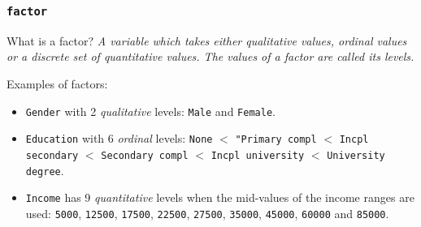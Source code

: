 \documentclass{beamer}\usepackage[]{graphicx}\usepackage[]{color}
\makeatletter
\newcommand{\hlopt}[1]{\textcolor[rgb]{0,0,0}{\textbf{#1}}}%
\newcommand{\hlstd}[1]{\textcolor[rgb]{0,0,0}{#1}}%
\newcommand{\hlkwd}[1]{\textcolor[rgb]{0,0.267,0.4}{#1}}%
\newenvironment{kframe}{%
 \def\at@end@of@kframe{}%
 \ifinner\ifhmode%
  \def\at@end@of@kframe{\end{minipage}}%
  \begin{minipage}{\columnwidth}%
 \fi\fi%
 \def\FrameCommand##1{\hskip\@totalleftmargin \hskip-\fboxsep
 \colorbox{shadecolor}{##1}\hskip-\fboxsep
     \hskip-\linewidth \hskip-\@totalleftmargin \hskip\columnwidth}%
 \MakeFramed {\advance\hsize-\width
   \@totalleftmargin\z@ \linewidth\hsize
   \@setminipage}}%
 {\par\unskip\endMakeFramed%
 \at@end@of@kframe}
\newenvironment{knitrout}{}{} %
\makeatother
\begin{document}
\begin{frame}
  \frametitle{\texttt{factor}}
  \begin{block}{What is a factor?}
    \textit{A variable which takes either qualitative values, ordinal values or a discrete set of quantitative values. The values of a factor are called its {\em levels}.}
  \end{block}
Examples of factors:  
\begin{itemize}
  \item \texttt{Gender} with 2 {\em qualitative} levels: \texttt{Male} and \texttt{Female}.
  \item \texttt{Education} with 6 {\em ordinal} levels: \texttt{None} $<$ \texttt{"Primary compl} $<$ \texttt{Incpl secondary} $<$ \texttt{Secondary compl} $<$ \texttt{Incpl university} $<$ \texttt{University degree}.
  \item \texttt{Income} has 9 {\em quantitative} levels when the mid-values of the income ranges are used: \texttt{5000}, \texttt{12500}, \texttt{17500}, \texttt{22500}, \texttt{27500}, \texttt{35000}, \texttt{45000}, \texttt{60000} and \texttt{85000}.
\end{itemize}
\end{frame}

\end{document}
